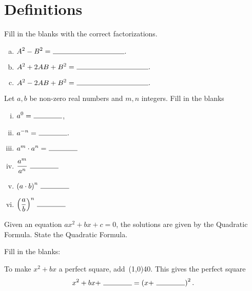 \documentclass[12pt]{amsart}
\begin{document}
\section{Definitions}
\begin{thm}[3 Points]\label{ex1}
  Fill in the blanks with the correct factorizations.
  \begin{enumerate}[(a)]
  \item
    $\displaystyle{A^2 - B^2 =\ \line(1,0){100}}.$
    \vspace{.3in}
  \item
    $\displaystyle{A^2 + 2AB + B^2 =\ \line(1,0){100}}.$
    \vspace{.3in}
  \item
    $\displaystyle{A^2 - 2AB + B^2 =\ \line(1,0){100}}.$
    \vspace{.3in}
  \end{enumerate}
\end{thm}

\begin{thm}[6 Points]\label{ex2}
  Let $a, b$ be non-zero real numbers and $m, n$ integers.
  Fill in the blanks
  \begin{enumerate}[(i)]
  \item
    $\displaystyle{a^0 =\ \line(1,0){40}}$,
  \item
    $\displaystyle{a^{-n} =\ \line(1,0){40}}.$
  \item
    $\displaystyle{a^m \cdot a^n =\ \line(1,0){40}}$
  \item
    $\displaystyle{\frac{a^m}{a^n}\ \line(1,0){40}}$
  \item
    $\displaystyle{\left(a \cdot b\right)^n\ \line(1,0){40}}$
  \item
    $\displaystyle{\left(\frac{a}{b}\right)^n\ \line(1,0){40}}$
  \end{enumerate}
\end{thm}

\newpage

\begin{thm}[2 Points]\label{ex3}
  Given an equation $ax^2 + bx + c = 0$, the solutions are given by the Quadratic Formula.  State the Quadratic Formula.
  \vspace{1in}
\end{thm}

\begin{thm}[3 Points]\label{ex4}
  Fill in the blanks:\\
  \begin{center}
    To make $x^2 + bx$ a perfect square, add\ \line(1,0){40}.
    This gives the perfect square
    $$x^2 + bx +\ \line(1,0){40} = \left(x +\ \line(1,0){40}\right)^2.$$
  \end{center}
\end{thm}
\end{document}
